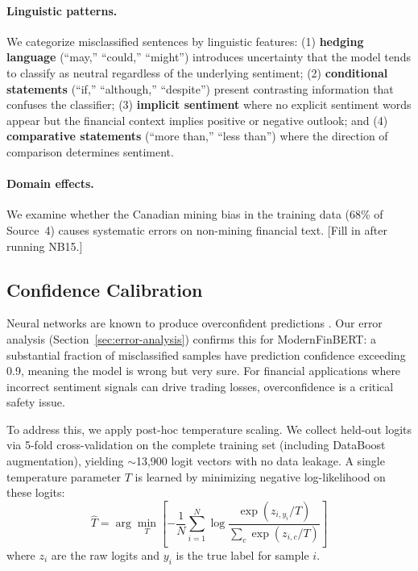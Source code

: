 \documentclass[11pt]{article}
\begin{document}
\paragraph{Linguistic patterns.}
We categorize misclassified sentences by linguistic features: (1) \textbf{hedging language} (``may,'' ``could,'' ``might'') introduces uncertainty that the model tends to classify as neutral regardless of the underlying sentiment; (2) \textbf{conditional statements} (``if,'' ``although,'' ``despite'') present contrasting information that confuses the classifier; (3) \textbf{implicit sentiment} where no explicit sentiment words appear but the financial context implies positive or negative outlook; and (4) \textbf{comparative statements} (``more than,'' ``less than'') where the direction of comparison determines sentiment.


\paragraph{Domain effects.}
We examine whether the Canadian mining bias in the training data (68\% of Source~4) causes systematic errors on non-mining financial text. [Fill in after running NB15.]

\subsection{Confidence Calibration}
\label{sec:calibration}

Neural networks are known to produce overconfident predictions \citep{guo2017calibration}. Our error analysis (Section~\ref{sec:error-analysis}) confirms this for ModernFinBERT: a substantial fraction of misclassified samples have prediction confidence exceeding 0.9, meaning the model is wrong but very sure. For financial applications where incorrect sentiment signals can drive trading losses, overconfidence is a critical safety issue.

To address this, we apply post-hoc temperature scaling. We collect held-out logits via 5-fold cross-validation on the complete training set (including DataBoost augmentation), yielding $\sim$13,900 logit vectors with no data leakage. A single temperature parameter $T$ is learned by minimizing negative log-likelihood on these logits:
\[
\hat{T} = \arg\min_T \left[ -\frac{1}{N} \sum_{i=1}^{N} \log \frac{\exp(z_{i,y_i} / T)}{\sum_c \exp(z_{i,c} / T)} \right]
\]
where $z_i$ are the raw logits and $y_i$ is the true label for sample $i$.
\end{document}
